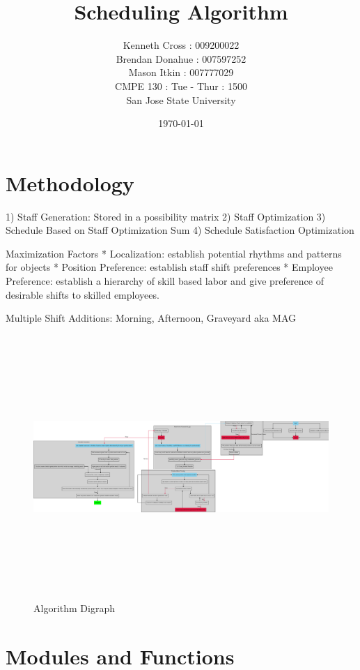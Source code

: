 \documentclass[a4paper,11pt]{article}
\author{Kenneth Cross : 009200022
        \\Brendan Donahue : 007597252
        \\Mason Itkin : 007777029
        \\CMPE 130 : Tue - Thur : 1500
        \\San Jose State University}
\title{\textbf{Scheduling Algorithm}}
\date{\today}
\begin{document}
\maketitle
\newpage
\tableofcontents
\newpage
{}
\setcounter{page}{1}

\newpage

\section{Methodology}

1) Staff Generation: Stored in a possibility matrix
2) Staff Optimization
3) Schedule Based on Staff Optimization Sum
4) Schedule Satisfaction Optimization

Maximization Factors
* Localization: establish potential rhythms and patterns for objects
* Position Preference: establish staff shift preferences
* Employee Preference: establish a hierarchy of skill based labor and give preference of desirable shifts to skilled employees. 

Multiple Shift Additions: Morning, Afternoon, Graveyard aka MAG

\begin{figure}
    \includegraphics[height=10cm]{graph.eps}
    \caption{\small Algorithm Digraph}
\end{figure}

\section{Modules and Functions}
\end{document}
